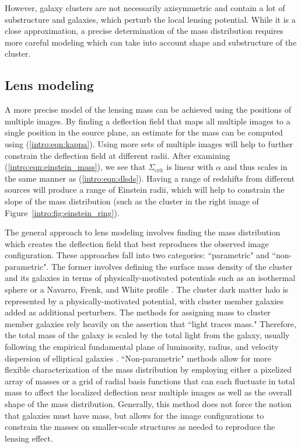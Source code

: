 However, galaxy clusters are not necessarily axisymmetric and contain a lot of substructure and galaxies, which perturb the local lensing potential. While it is a close approximation, a precise determination of the mass distribution requires more careful modeling which can take into account shape and substructure of the cluster.

\subsection{Lens modeling}

A more precise model of the lensing mass can be achieved using the positions of multiple images. By finding a deflection field that maps all multiple images to a single position in the source plane, an estimate for the mass can be computed using (\ref{intro:eqn:kappa}). Using more sets of multiple images will help to further constrain the deflection field at different radii. After examining (\ref{intro:eqn:einstein_mass}), we see that $\Sigma_\mathrm{crit}$ is linear with $\alpha$ and thus scales in the same manner as (\ref{intro:eqn:dlsds}). Having a range of redshifts from different sources will produce a range of Einstein radii, which will help to constrain the slope of the mass distribution (such as the cluster in the right image of Figure~\ref{intro:fig:einstein_ring}).

The general approach to lens modeling involves finding the mass distribution which creates the deflection field that best reproduces the observed image configuration. These approaches fall into two categories: ``parametric" and ``non-parametric". The former involves defining the surface mass density of the cluster and its galaxies in terms of physically-motivated potentials such as an isothermal sphere or a Navarro, Frenk, and White profile \citep[NFW; ][]{Navarro:1997qa}. The cluster dark matter halo is represented by a physically-motivated potential, with cluster member galaxies added as additional perturbers. The methods for assigning mass to cluster member galaxies rely heavily on the assertion that ``light traces mass." Therefore, the total mass of the galaxy is scaled by the total light from the galaxy, usually following the empirical fundamental plane of luminosity, radius, and velocity dispersion of elliptical galaxies \citep{Gudehus:1973kq}. ``Non-parametric" methods allow for more flexible characterization of the mass distribution by employing either a pixelized array of masses or a grid of radial basis functions that can each fluctuate in total mass to affect the localized deflection near multiple images as well as the overall shape of the mass distribution. Generally, this method does not force the notion that galaxies must have mass, but allows for the image configurations to constrain the masses on smaller-scale structures as needed to reproduce the lensing effect.

